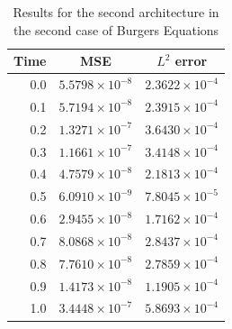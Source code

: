 \documentclass[12pt,letterpaper]{article}
\begin{document}
  \begin{table}[H]
    \begin{center}
    \begin{tabular}{ r | c  c }
    \textbf{Time} & \textbf{MSE} & \textbf{$L^2$ error} \\ \hline
    0.0 & $ 5.5798\times 10^{-8}$ & $ 2.3622\times 10^{-4} $ \\
    0.1 & $ 5.7194\times 10^{-8}$ & $ 2.3915\times 10^{-4} $ \\
    0.2 & $ 1.3271\times 10^{-7}$ & $ 3.6430\times 10^{-4} $ \\
    0.3 & $ 1.1661\times 10^{-7}$ & $ 3.4148\times 10^{-4} $ \\
    0.4 & $ 4.7579\times 10^{-8}$ & $ 2.1813\times 10^{-4} $ \\
    0.5 & $ 6.0910\times 10^{-9}$ & $ 7.8045\times 10^{-5} $ \\
    0.6 & $ 2.9455\times 10^{-8}$ & $ 1.7162\times 10^{-4} $ \\
    0.7 & $ 8.0868\times 10^{-8}$ & $ 2.8437\times 10^{-4} $ \\
    0.8 & $ 7.7610\times 10^{-8}$ & $ 2.7859\times 10^{-4} $ \\
    0.9 & $ 1.4173\times 10^{-8}$ & $ 1.1905\times 10^{-4} $ \\
    1.0 & $ 3.4448\times 10^{-7}$ & $ 5.8693\times 10^{-4} $ \\
    \end{tabular}
    \caption{Results for the second architecture in the second case of Burgers Equations}
    \label{tab:B22}
    \end{center}

    \end{table}
\end{document}
